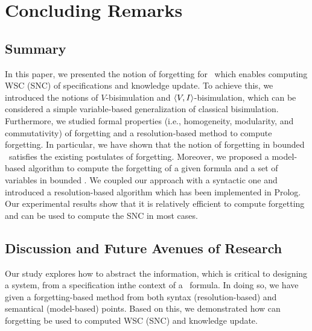 \documentclass[twoside,11pt]{article}
\begin{document}
	
	\section{Concluding Remarks}
	\subsection{Summary}
	In this paper, we presented the notion of forgetting for \CTL\
	which enables computing WSC (SNC) of specifications and knowledge update.
	To achieve this, we introduced  the notions of $V$-bisimulation and ${\langle{V,I}\rangle}$-bisimulation, which can be considered  a simple variable-based generalization of classical bisimulation.
	Furthermore, we studied formal properties (i.e., homogeneity, modularity, and commutativity) of forgetting and a resolution-based method to compute forgetting.
	In particular, we  have shown that the notion of forgetting in bounded \CTL\ satisfies the existing postulates of forgetting.
	Moreover, we proposed a model-based algorithm to compute the forgetting of a given formula and a set of variables in bounded \CTL.
	We coupled our approach with a syntactic one and introduced a resolution-based algorithm which has been implemented in Prolog.  Our experimental results show that it is relatively efficient to compute forgetting and can be used to compute the SNC in most cases.
	
	
	
	
	
	\subsection{Discussion and Future Avenues of Research}
	
	Our  study explores how to abstract the information, which is critical to designing a system, from a specification inthe context of a \CTL\ formula. In doing so, we have given a forgetting-based method from both syntax (resolution-based) and semantical (model-based) points. Based on this, we demonstrated how can forgetting be used to computed WSC (SNC) and knowledge update.
	
\end{document}
